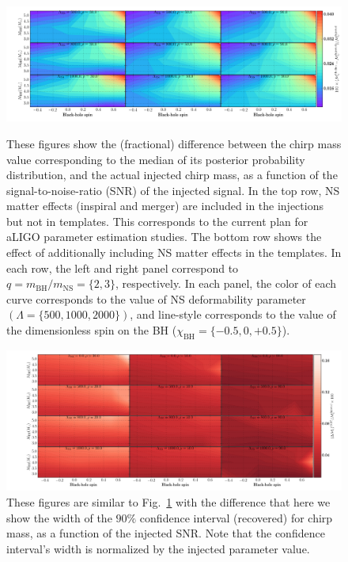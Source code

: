 \documentclass[aps,prd,amsmath,floats,floatfix, twocolumn,
superscriptaddress,nofootinbib,showpacs]{revtex4-1}
\begin{document}
\begin{figure}
\centering 
\includegraphics[trim={{0.2\columnwidth} 0 0 0},width=2.1\columnwidth]{plots-TN/TN_MchirpBiases_Lambda_SNR.pdf}\\ 
\caption{These figures show the (fractional) difference between the chirp mass 
value corresponding to the median of its posterior probability distribution,
and the actual injected chirp mass,
as a function of the signal-to-noise-ratio (SNR) of the injected signal.
In the top row, NS matter effects (inspiral and merger) are included in the
injections but not in templates. This corresponds to the current 
plan for aLIGO parameter estimation studies. The bottom row shows the effect
of additionally including NS matter effects in the templates.
% 
In each row, the left and right panel correspond to 
$q=m_\mathrm{BH}/m_\mathrm{NS}=\{2,3\}$, respectively. 
In each panel, the color of each curve corresponds to the value of NS 
deformability parameter $(\Lambda=\{500,1000,2000\})$, 
and line-style corresponds to the value of
the dimensionless spin on the BH ($\chi_\mathrm{BH}=\{-0.5,0,+0.5\}$).
}
\label{fig:TNT_chirpMassBias_vs_SNR_q23}
\end{figure}
% 
\begin{figure}
\centering
\includegraphics[trim={{0.4\columnwidth} 0 0 0},width=2.2\columnwidth]{plots-TN/TN_MchirpCIWidths90_0_Lambda_SNR.pdf}
\caption{These figures are similar to Fig.~\ref{fig:TNT_chirpMassBias_vs_SNR_q23}
with the difference that here we show the width of the $90\%$ confidence 
interval (recovered) for chirp mass, as a function of the injected SNR. 
Note that the confidence interval's width is normalized by the injected
parameter value.
}
\label{fig:TNT_chirpMassCIWidth90_vs_SNR_q23}
\end{figure}
% 
\newpage
\newpage
\end{document}

